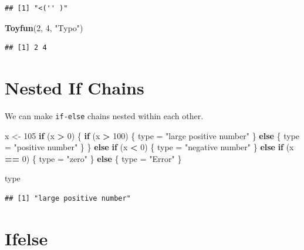 \documentclass[
]{book}
\newenvironment{Shaded}{\begin{snugshade}}{\end{snugshade}}
\newcommand{\ControlFlowTok}[1]{\textcolor[rgb]{0.13,0.29,0.53}{\textbf{#1}}}
\newcommand{\DecValTok}[1]{\textcolor[rgb]{0.00,0.00,0.81}{#1}}
\newcommand{\KeywordTok}[1]{\textcolor[rgb]{0.13,0.29,0.53}{\textbf{#1}}}
\newcommand{\NormalTok}[1]{#1}
\newcommand{\OperatorTok}[1]{\textcolor[rgb]{0.81,0.36,0.00}{\textbf{#1}}}
\newcommand{\StringTok}[1]{\textcolor[rgb]{0.31,0.60,0.02}{#1}}
\begin{document}
\begin{verbatim}
## [1] "<('' )"
\end{verbatim}

\begin{Shaded}
\begin{Highlighting}[]
\KeywordTok{Toyfun}\NormalTok{(}\DecValTok{2}\NormalTok{, }\DecValTok{4}\NormalTok{, }\StringTok{"Typo"}\NormalTok{)}
\end{Highlighting}
\end{Shaded}

\begin{verbatim}
## [1] 2 4
\end{verbatim}

\hypertarget{nested-if-chains}{%
\section{Nested If Chains}\label{nested-if-chains}}

We can make \texttt{if-else} chains nested within each other.

\begin{Shaded}
\begin{Highlighting}[]
\NormalTok{x <-}\StringTok{ }\DecValTok{105}
\ControlFlowTok{if}\NormalTok{ (x }\OperatorTok{>}\StringTok{ }\DecValTok{0}\NormalTok{) \{}
    \ControlFlowTok{if}\NormalTok{ (x }\OperatorTok{>}\StringTok{ }\DecValTok{100}\NormalTok{) \{}
\NormalTok{        type =}\StringTok{ "large positive number"}
\NormalTok{    \} }\ControlFlowTok{else}\NormalTok{ \{}
\NormalTok{        type =}\StringTok{ "positive number"}
\NormalTok{    \}}
\NormalTok{\} }\ControlFlowTok{else} \ControlFlowTok{if}\NormalTok{ (x }\OperatorTok{<}\StringTok{ }\DecValTok{0}\NormalTok{) \{}
\NormalTok{    type =}\StringTok{ "negative number"}
\NormalTok{\} }\ControlFlowTok{else} \ControlFlowTok{if}\NormalTok{ (x }\OperatorTok{==}\StringTok{ }\DecValTok{0}\NormalTok{) \{}
\NormalTok{    type =}\StringTok{ "zero"}
\NormalTok{\} }\ControlFlowTok{else}\NormalTok{ \{}
\NormalTok{    type =}\StringTok{ "Error"}
\NormalTok{\}}

\NormalTok{type}
\end{Highlighting}
\end{Shaded}

\begin{verbatim}
## [1] "large positive number"
\end{verbatim}

\hypertarget{ifelse}{%
\section{Ifelse}\label{ifelse}}
\end{document}
